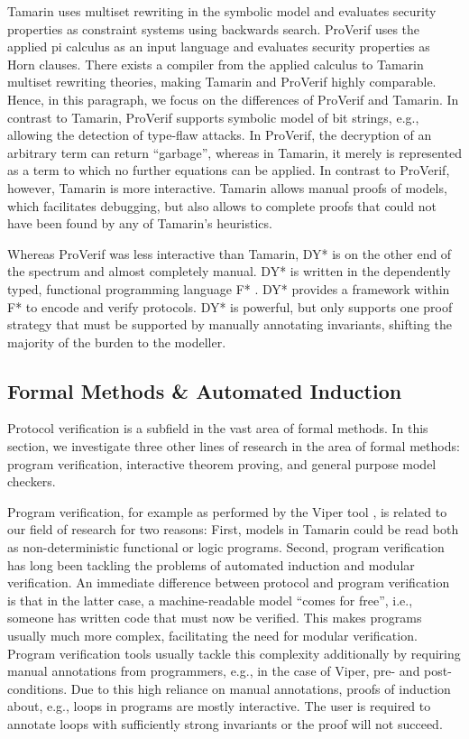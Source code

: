 \documentclass{article}
\begin{document}
Tamarin uses multiset rewriting in the symbolic model and evaluates security properties as constraint systems using backwards search.
ProVerif uses the applied pi calculus as an input language and evaluates security properties as Horn clauses.
There exists a compiler from the applied calculus to Tamarin multiset rewriting theories, making Tamarin and ProVerif highly comparable.
Hence, in this paragraph, we focus on the differences of ProVerif and Tamarin.
In contrast to Tamarin, ProVerif supports symbolic model of bit strings, e.g., allowing the detection of type-flaw attacks.
In ProVerif, the decryption of an arbitrary term can return ``garbage'', whereas in Tamarin, it merely is represented as a term to which no further equations can be applied.
In contrast to ProVerif, however, Tamarin is more interactive.
Tamarin allows manual proofs of models, which facilitates debugging, but also allows to complete proofs that could not have been found by any of Tamarin's heuristics.

Whereas ProVerif was less interactive than Tamarin, DY* is on the other end of the spectrum and almost completely manual.
DY* is written in the dependently typed, functional programming language F* \cite{FStar}.
DY* provides a framework within F* to encode and verify protocols.
DY* is powerful, but only supports one proof strategy that must be supported by manually annotating invariants, shifting the majority of the burden to the modeller.

\subsection{Formal Methods \& Automated Induction}

Protocol verification is a subfield in the vast area of formal methods.
In this section, we investigate three other lines of research in the area of formal methods: program verification, interactive theorem proving, and general purpose model checkers.

Program verification, for example as performed by the Viper tool \cite{Viper}, is related to our field of research for two reasons:
First, models in Tamarin could be read both as non-deterministic functional or logic programs.
Second, program verification has long been tackling the problems of automated induction and modular verification.
An immediate difference between protocol and program verification is that in the latter case, a machine-readable model ``comes for free'', i.e., someone has written code that must now be verified.
This makes programs usually much more complex, facilitating the need for modular verification.
Program verification tools usually tackle this complexity additionally by requiring manual annotations from programmers, e.g., in the case of Viper, pre- and post-conditions.
Due to this high reliance on manual annotations, proofs of induction about, e.g., loops in programs are mostly interactive.
The user is required to annotate loops with sufficiently strong invariants or the proof will not succeed.
\end{document}
